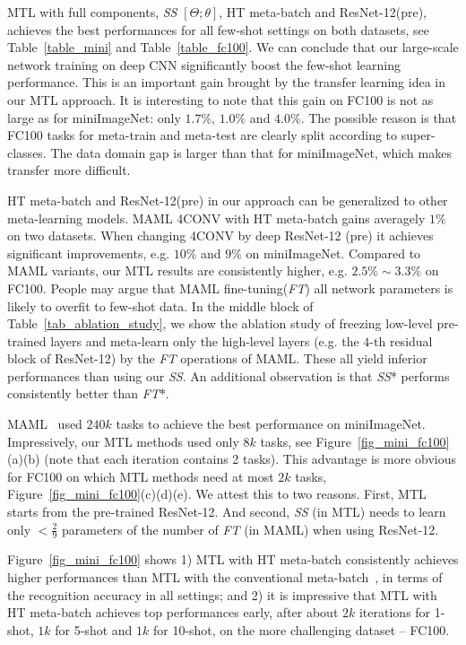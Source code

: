 MTL with full components, \emph{SS} $[\Theta; \theta]$, HT meta-batch and ResNet-12(pre), achieves the best performances for all few-shot settings on both datasets, see Table~\ref{table_mini} and Table~\ref{table_fc100}. 
%
We can conclude that our large-scale network training on deep CNN significantly boost the few-shot learning performance. This is an important gain brought by the transfer learning idea in our MTL approach. 
It is interesting to note that this gain on FC100 is not as large as for miniImageNet: only $1.7\%$, $1.0\%$ and $4.0\%$. 
The possible reason is that FC100 tasks for meta-train and meta-test are clearly split according to super-classes. The data domain gap is larger than that for miniImageNet, which makes transfer more difficult.

HT meta-batch and ResNet-12(pre) in our approach can be generalized to other meta-learning models. 
MAML 4CONV with HT meta-batch gains averagely $1\%$ on two datasets. When changing 4CONV by deep ResNet-12 (pre)
it achieves significant improvements, e.g. $10\%$ and $9\%$ on miniImageNet.
Compared to MAML variants, our MTL results are consistently higher, e.g. $2.5\% \sim 3.3\%$ on FC100.
%
People may argue that MAML fine-tuning(\emph{FT}) all network parameters is likely to overfit to few-shot data. In the middle block of Table~\ref{tab_ablation_study},
we show the ablation study of freezing low-level pre-trained layers and meta-learn only the high-level layers (e.g. the $4$-th residual block of ResNet-12) by the \emph{FT} operations of MAML.
These all yield inferior performances than using our \emph{SS}. 
An additional observation is that \emph{SS}* performs consistently better than \emph{FT}*.
%

%
MAML~\cite{FinnAL17} used $240k$ tasks to achieve the best performance on miniImageNet.
Impressively, our MTL methods used only $8k$ tasks, see Figure~\ref{fig_mini_fc100}(a)(b) (note that each iteration contains 2 tasks). 
%
This advantage is more obvious for FC100 on which MTL methods need at most $2k$ tasks, Figure~\ref{fig_mini_fc100}(c)(d)(e).
%
We attest this to two reasons. First, MTL starts from the pre-trained ResNet-12. 
And second, \emph{SS} (in MTL) needs to learn only $< \tfrac{2}{9}$ parameters of the number of \emph{FT} (in MAML) when using ResNet-12. 
%

Figure~\ref{fig_mini_fc100} shows 1) MTL with HT meta-batch consistently achieves higher performances than MTL with the conventional meta-batch~\cite{FinnAL17}, in terms of the recognition accuracy in all settings; 
and 2) it is impressive that MTL with HT meta-batch achieves top performances early, after \eg about $2k$ iterations for 1-shot, $1k$ for 5-shot and $1k$ for 10-shot, on the more challenging dataset -- FC100. 

